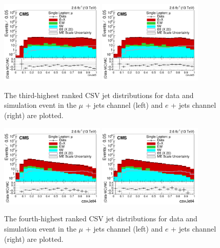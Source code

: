 \begin{figure}[ht!]
    \includegraphics[width=0.44\textwidth]{images/Run2/csvJet3_StackLogY_noSF.pdf}
    \includegraphics[width=0.44\textwidth]{images/Run2/csvJet3_StackLogY.pdf}
    \caption{ The third-highest ranked CSV jet distributions for data and simulation event in the $\mu$ + jets channel (left) and $e$ + jets channel (right) are plotted.}
    \label{fig:csvJet3SF}
\end{figure}
\begin{figure}[ht!]
    \includegraphics[width=0.44\textwidth]{images/Run2/csvJet4_StackLogY_noSF.pdf}
    \includegraphics[width=0.44\textwidth]{images/Run2/csvJet4_StackLogY.pdf}
    \caption{ The fourth-highest ranked CSV jet distributions for data and simulation event in the $\mu$ + jets channel (left) and $e$ + jets channel (right) are plotted.}
    \label{fig:csvJet4SF}
\end{figure}

